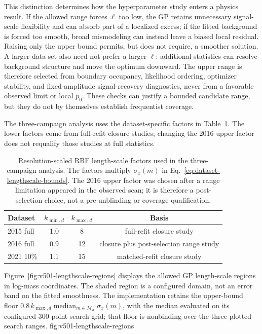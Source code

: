 This distinction determines how the hyperparameter study enters a physics result.
If the allowed range forces $\ell$ too low, the GP retains unnecessary
signal-scale flexibility and can absorb part of a localized excess; if the fitted
background is forced too smooth, broad mismodeling can instead leave a biased local
residual. Raising only the upper bound permits, but does not require, a smoother
solution. A larger data set also need not prefer a larger $\ell$: additional
statistics can resolve background structure and move the optimum downward. The
upper range is therefore selected from boundary occupancy, likelihood ordering,
optimizer stability, and fixed-amplitude signal-recovery diagnostics, never from a
favorable observed limit or local $p_0$. These checks can justify a bounded candidate
range, but they do not by themselves establish frequentist coverage.

The three-campaign analysis uses the dataset-specific factors in
Table~\ref{tab:production-lengthscale-bounds}. The lower factors come from full-refit
closure studies; changing the 2016 upper factor does not requalify those studies at
full statistics.

\begin{table}[H]
\centering
\begin{tabular}{lccc}
\toprule
Dataset & $k_{\min,d}$ & $k_{\max,d}$ & Basis \\
\midrule
2015 full & 1.0 & 8 & full-refit closure study \\
2016 full & 0.9 & 12 & closure plus post-selection range study \\
2021 10\% & 1.1 & 15 & matched-refit closure study \\
\bottomrule
\end{tabular}
\caption{Resolution-scaled RBF length-scale factors used in the three-campaign
analysis. The factors multiply $\sigma_x(m)$ in
Eq.~\eqref{eq:dataset-lengthscale-bounds}. The 2016 upper factor was chosen after a
range limitation appeared in the observed scan; it is therefore a post-selection
choice, not a pre-unblinding or coverage qualification.}
\label{tab:production-lengthscale-bounds}
\end{table}

Figure~\ref{fig:v501-lengthscale-regions} displays the allowed GP length-scale
regions in log-mass coordinates. The shaded region is a configured domain, not
an error band on the fitted smoothness. The implementation retains the upper-bound
floor $0.8\,k_{\max,d}\operatorname{median}_{m\in\mathcal M_d}\sigma_x(m)$,
with the median evaluated on its configured 300-point search grid; that floor is
nonbinding over the three plotted search ranges.
{fig:v501-lengthscale-regions}

